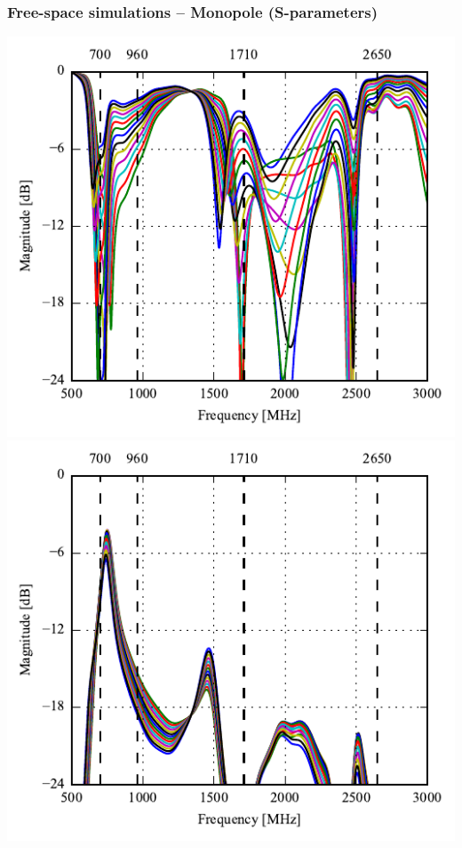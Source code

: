 \begin{frame}
    \frametitle{Free-space simulations -- Monopole (S-parameters)}
    \vspace*{-0.5cm}
  \begin{minipage}[t]{0.49\linewidth}
    \vspace{0mm}

    \includegraphics[width=0.78\linewidth]{img/henrik/mono/s11} \\
    \includegraphics[width=0.78\linewidth]{img/henrik/mono/s21-s11} 

  \end{minipage}\hfill       
  \begin{minipage}[t]{0.49\linewidth}
    \vspace{0 mm}


\end{minipage}
\end{frame}
